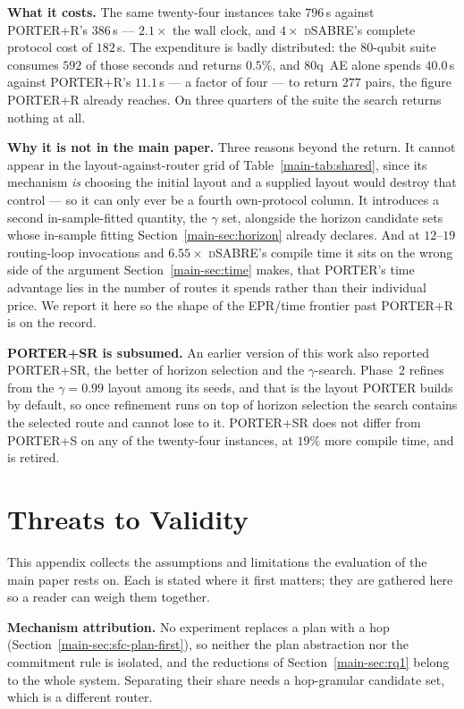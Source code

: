 \documentclass[journal]{IEEEtran}
\newcommand{\PORTER}{\textsc{PORTER}}
\newcommand{\dSABRE}{\textsc{dSABRE}}
\newcommand{\mainCompileTime}{Section~\ref{main-sec:time}}
\newcommand{\mainSharedTable}{Table~\ref{main-tab:shared}}
\newcommand{\mainHorizon}{Section~\ref{main-sec:horizon}}
\newcommand{\mainPlanFirst}{Section~\ref{main-sec:sfc-plan-first}}
\newcommand{\mainOwnProtocol}{Section~\ref{main-sec:rq1}}
\begin{document}
\textbf{What it costs.} The same twenty-four instances take $796$\,s
against \PORTER{}+R's $386$\,s --- $2.1\times$ the wall clock, and
$4\times$ \dSABRE{}'s complete protocol cost of $182$\,s. The
expenditure is badly distributed: the 80-qubit suite consumes $592$
of those seconds and returns $0.5\%$, and 80q~AE alone spends $40.0$\,s
against \PORTER{}+R's $11.1$\,s --- a factor of four --- to return
$277$ pairs, the figure \PORTER{}+R already reaches. On three quarters of
the suite the search returns nothing at all.

\textbf{Why it is not in the main paper.} Three reasons beyond the
return. It cannot appear in the layout-against-router grid of
\mainSharedTable{}, since its mechanism \emph{is} choosing the initial
layout and a supplied layout would destroy that control --- so it can
only ever be a fourth own-protocol column. It introduces a second
in-sample-fitted quantity, the $\gamma$ set, alongside the horizon
candidate sets whose in-sample fitting \mainHorizon{} already
declares. And at $12$--$19$ routing-loop invocations and $6.55\times$ \dSABRE{}'s compile
time it sits on the wrong side of the argument \mainCompileTime{} makes,
that \PORTER{}'s time advantage lies in the number of routes it spends
rather than their individual price. We report it here so the shape of
the EPR/time frontier past \PORTER{}+R is on the record.

\textbf{\PORTER{}+SR is subsumed.} An earlier version of this work also
reported \PORTER{}+SR, the better of horizon selection and the
$\gamma$-search. Phase~2 refines from the $\gamma{=}0.99$ layout among
its seeds, and that is the layout \PORTER{} builds by default, so once
refinement runs on top of horizon selection the search contains the
selected route and cannot lose to it. \PORTER{}+SR does not differ from
\PORTER{}+S on any of the twenty-four instances, at $19\%$ more compile
time, and is retired.


\section{Threats to Validity}
\label{app:threats}

This appendix collects the assumptions and limitations the evaluation of
the main paper rests on. Each is stated where it first matters; they are
gathered here so a reader can weigh them together.

\textbf{Mechanism attribution.} No experiment replaces a plan with a hop
(\mainPlanFirst{}), so neither the plan abstraction nor the commitment
rule is isolated, and the reductions of \mainOwnProtocol{} belong to the whole
system. Separating their share needs a hop-granular candidate set, which
is a different router.
\end{document}
